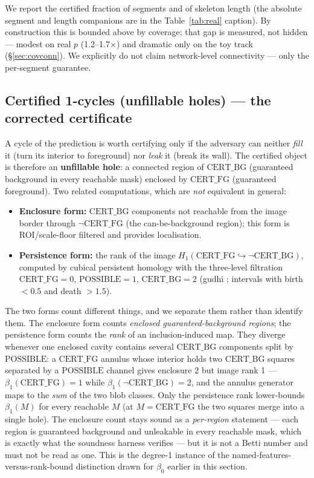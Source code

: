 \documentclass[10pt]{article}
\newcommand{\CFG}{\mathrm{CERT\_FG}}
\newcommand{\CBG}{\mathrm{CERT\_BG}}
\newcommand{\POSS}{\mathrm{POSSIBLE}}
\begin{document}
We report the certified fraction of segments and of skeleton length (the
absolute segment and length companions are in the Table~\ref{tab:real}
caption). By
construction this is bounded above by coverage; that gap is measured, not
hidden --- modest on real $p$ (1.2--1.7$\times$) and dramatic only on the
toy track (\S\ref{sec:covconn}). We explicitly do not claim
network-level connectivity --- only the per-segment guarantee.

\subsection{Certified 1-cycles (unfillable holes) --- the corrected
certificate}\label{sec:cycles}
A cycle of the prediction is worth certifying only if the adversary can
neither \emph{fill} it (turn its interior to foreground) nor \emph{leak}
it (break its wall). The certified object is therefore an
\textbf{unfillable hole}: a connected region of $\CBG$ (guaranteed
background in every reachable mask) enclosed by $\CFG$ (guaranteed
foreground). Two related computations, which are \emph{not} equivalent in general:
\begin{itemize}
\item \textbf{Enclosure form:} $\CBG$ components not reachable from the
  image border through $\lnot\CFG$ (the can-be-background region); this
  form is ROI/scale-floor filtered and provides localisation.
\item \textbf{Persistence form:} the rank of the image
  $H_1(\CFG \hookrightarrow \lnot\CBG)$, computed by cubical persistent
  homology \citep{cohensteiner2009image} with the three-level filtration
  $\CFG=0$, $\POSS=1$, $\CBG=2$ (gudhi \citep{gudhi}; intervals with
  birth $<0.5$ and death $>1.5$).
\end{itemize}
The two forms count different things, and we separate them rather than
identify them. The enclosure form counts \emph{enclosed
guaranteed-background regions}; the persistence form counts the
\emph{rank} of an inclusion-induced map. They diverge whenever one
enclosed cavity contains several $\CBG$ components split by $\POSS$: a
$\CFG$ annulus whose interior holds two $\CBG$ squares separated by a
$\POSS$ channel gives enclosure 2 but image rank 1 ---
$\beta_1(\CFG)=1$ while $\beta_1(\lnot\CBG)=2$, and the annulus
generator maps to the \emph{sum} of the two blob classes. Only the
persistence rank lower-bounds $\beta_1(M)$ for every reachable $M$ (at
$M=\CFG$ the two squares merge into a single hole). The enclosure count
stays sound as a \emph{per-region} statement --- each region is
guaranteed background and unleakable in every reachable mask, which is
exactly what the soundness harness verifies --- but it is not a Betti number and
must not be read as one. This is the degree-1 instance of the
named-features-versus-rank-bound distinction drawn for $\beta_0$ earlier
in this section.
\end{document}
